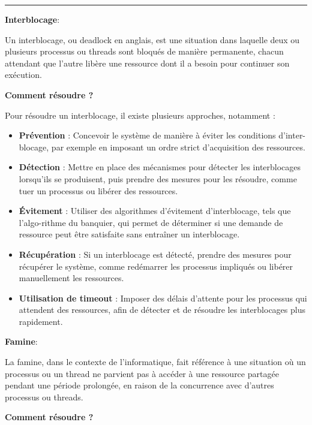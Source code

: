 \begin{center}
\rule{5cm}{0.4pt}
\end{center}

\vspace{0.5cm}

\noindent \textbf{Interblocage}:

\noindent Un interblocage, ou deadlock en anglais, est une situation dans laquelle deux ou plusieurs processus ou threads sont bloqués de manière permanente, chacun attendant que l'autre libère une ressource dont il a besoin pour continuer son exécution.

\noindent \textbf{Comment résoudre ?}

\noindent Pour résoudre un interblocage, il existe plusieurs approches, notamment :
\begin{itemize}
    \item \textbf{Prévention} : Concevoir le système de manière à éviter les conditions d'inter-blocage, par exemple en imposant un ordre strict d'acquisition des ressources.
    \item \textbf{Détection} : Mettre en place des mécanismes pour détecter les interblocages lorsqu'ils se produisent, puis prendre des mesures pour les résoudre, comme tuer un processus ou libérer des ressources.
    \item \textbf{Évitement} : Utiliser des algorithmes d'évitement d'interblocage, tels que l'algo-rithme du banquier, qui permet de déterminer si une demande de ressource peut être satisfaite sans entraîner un interblocage.
    \item \textbf{Récupération} : Si un interblocage est détecté, prendre des mesures pour récupérer le système, comme redémarrer les processus impliqués ou libérer manuellement les ressources.
    \item \textbf{Utilisation de timeout} : Imposer des délais d'attente pour les processus qui attendent des ressources, afin de détecter et de résoudre les interblocages plus rapidement.
\end{itemize}

\newpage

\noindent \textbf{Famine}:

\noindent La famine, dans le contexte de l'informatique, fait référence à une situation où un processus ou un thread ne parvient pas à accéder à une ressource partagée pendant une période prolongée, en raison de la concurrence avec d'autres processus ou threads.

\noindent \textbf{Comment résoudre ?}

